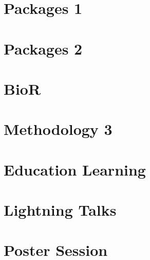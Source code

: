 \documentclass[11pt,oneside]{book}
\begin{document}
\chapter{Packages 1}


% 



\chapter{Packages 2}






\chapter{BioR}






\chapter{Methodology 3}

% 



\chapter{Education Learning}





\chapter{Lightning Talks}





% 








\chapter{Poster Session}











% 


\backmatter
\printindex[a]
\printindex[p]
\end{document}
